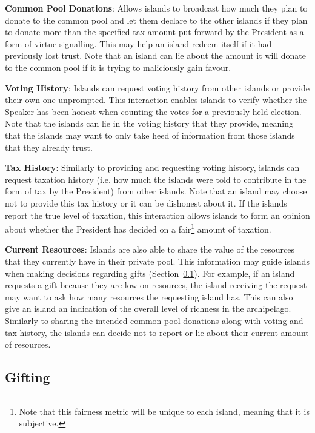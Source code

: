 \textbf{Common Pool Donations}: Allows islands to broadcast how much they plan to donate to the common pool and let them declare to the other islands if they plan to donate more than the specified tax amount put forward by the President as a form of virtue signalling. This may help an island redeem itself if it had previously lost trust. Note that an island can lie about the amount it will donate to the common pool if it is trying to maliciously gain favour.

\textbf{Voting History}: Islands can request voting history from other islands or provide their own one unprompted. This interaction enables islands to verify whether the Speaker has been honest when counting the votes for a previously held election. Note that the islands can lie in the voting history that they provide, meaning that the islands may want to only take heed of information from those islands that they already trust.

\textbf{Tax History}: Similarly to providing and requesting voting history, islands can request taxation history (i.e. how much the islands were told to contribute in the form of tax by the President) from other islands. Note that an island may choose not to provide this tax history or it can be dishonest about it. If the islands report the true level of taxation, this interaction allows islands to form an opinion about whether the President has decided on a fair\footnote{Note that this fairness metric will be unique to each island, meaning that it is subjective.} amount of taxation.

\textbf{Current Resources}: Islands are also able to share the value of the resources that they currently have in their private pool. This information may guide islands when making decisions regarding gifts (Section~\ref{subsec:IITO:gifting}). For example, if an island requests a gift because they are low on resources, the island receiving the request may want to ask how many resources the requesting island has. This can also give an island an indication of the overall level of richness in the archipelago. Similarly to sharing the intended common pool donations along with voting and tax history, the islands can decide not to report or lie about their current amount of resources.

\subsection{Gifting}  
\label{subsec:IITO:gifting}  

